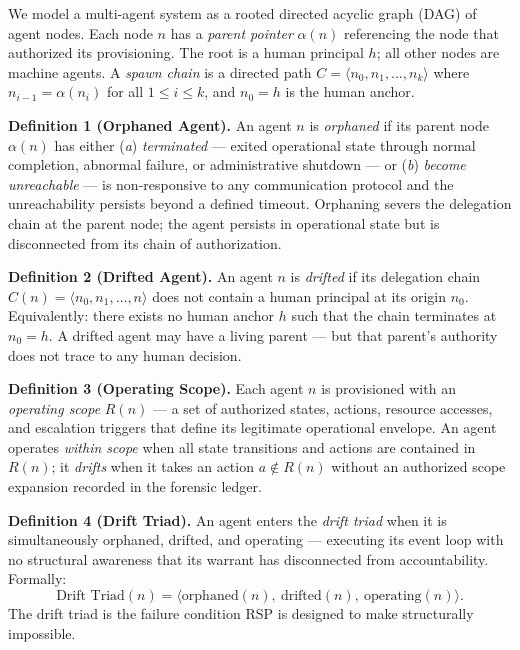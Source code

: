 We model a multi-agent system as a rooted directed acyclic graph (DAG) of agent nodes. Each node $n$ has a \emph{parent pointer} $\alpha(n)$ referencing the node that authorized its provisioning. The root is a human principal $h$; all other nodes are machine agents. A \emph{spawn chain} is a directed path $C = \langle n_0, n_1, \ldots, n_k \rangle$ where $n_{i-1} = \alpha(n_i)$ for all $1 \leq i \leq k$, and $n_0 = h$ is the human anchor.

\medskip
\noindent\textbf{Definition 1 (Orphaned Agent).} An agent $n$ is \emph{orphaned} if its parent node $\alpha(n)$ has either (\textit{a}) \emph{terminated} — exited operational state through normal completion, abnormal failure, or administrative shutdown — or (\textit{b}) \emph{become unreachable} — is non-responsive to any communication protocol and the unreachability persists beyond a defined timeout. Orphaning severs the delegation chain at the parent node; the agent persists in operational state but is disconnected from its chain of authorization.

\medskip
\noindent\textbf{Definition 2 (Drifted Agent).} An agent $n$ is \emph{drifted} if its delegation chain $C(n) = \langle n_0, n_1, \ldots, n \rangle$ does not contain a human principal at its origin $n_0$. Equivalently: there exists no human anchor $h$ such that the chain terminates at $n_0 = h$. A drifted agent may have a living parent — but that parent's authority does not trace to any human decision.

\medskip
\noindent\textbf{Definition 3 (Operating Scope).} Each agent $n$ is provisioned with an \emph{operating scope} $R(n)$ — a set of authorized states, actions, resource accesses, and escalation triggers that define its legitimate operational envelope. An agent operates \emph{within scope} when all state transitions and actions are contained in $R(n)$; it \emph{drifts} when it takes an action $a \notin R(n)$ without an authorized scope expansion recorded in the forensic ledger.

\medskip
\noindent\textbf{Definition 4 (Drift Triad).} An agent enters the \emph{drift triad} when it is simultaneously orphaned, drifted, and operating — executing its event loop with no structural awareness that its warrant has disconnected from accountability. Formally:
\begin{equation}
\text{Drift Triad}(n) = \bigl\langle \text{orphaned}(n),\ \text{drifted}(n),\ \text{operating}(n) \bigr\rangle.
\label{eq:drift-triad}
\end{equation}
The drift triad is the failure condition RSP is designed to make structurally impossible.

